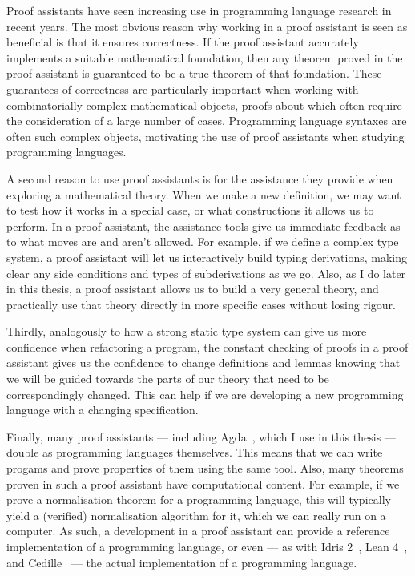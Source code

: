 Proof assistants have seen increasing use in programming language research in
recent years.
The most obvious reason why working in a proof assistant is seen as beneficial
is that it ensures correctness.
If the proof assistant accurately implements a suitable mathematical foundation,
then any theorem proved in the proof assistant is guaranteed to be a true
theorem of that foundation.
These guarantees of correctness are particularly important when working with
combinatorially complex mathematical objects, proofs about which often require
the consideration of a large number of cases.
Programming language syntaxes are often such complex objects, motivating the use
of proof assistants when studying programming languages.

A second reason to use proof assistants is for the assistance they provide when
exploring a mathematical theory.
When we make a new definition, we may want to test how it works in a special
case, or what constructions it allows us to perform.
In a proof assistant, the assistance tools give us immediate feedback as to what
moves are and aren't allowed.
For example, if we define a complex type system, a proof assistant will let us
interactively build typing derivations, making clear any side conditions and
types of subderivations as we go.
Also, as I do later in this thesis, a proof assistant allows us to build a very
general theory, and practically use that theory directly in more specific cases
without losing rigour.

Thirdly, analogously to how a strong static type system can give us more
confidence when refactoring a program, the constant checking of proofs in a
proof assistant gives us the confidence to change definitions and lemmas knowing
that we will be guided towards the parts of our theory that need to be
correspondingly changed.
This can help if we are developing a new programming language with a changing
specification.

Finally, many proof assistants --- including Agda~\citep{Agda}, which I use in
this thesis --- double as programming languages themselves.
This means that we can write progams and prove properties of them using the same
tool.
Also, many theorems proven in such a proof assistant have computational content.
For example, if we prove a normalisation theorem for a programming language,
this will typically yield a (verified) normalisation algorithm for it, which we
can really run on a computer.
As such, a development in a proof assistant can provide a reference
implementation of a programming language, or even --- as with Idris
2~\citep{Brady21}, Lean 4~\citep{deMU21}, and Cedille~\citep{GRS16} --- the
actual implementation of a programming language.

